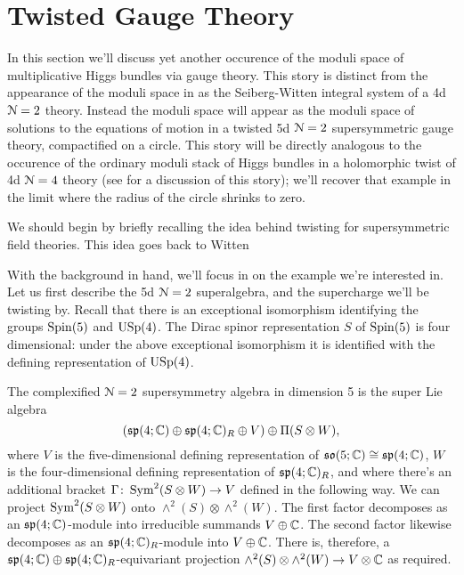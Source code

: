 \documentclass[10pt, oneside]{article}
\begin{document}
\section{Twisted Gauge Theory}
In this section we'll discuss yet another occurence of the moduli space of multiplicative Higgs bundles via gauge theory.  This story is distinct from the appearance of the moduli space in \cite{NekrasovPestun} as the Seiberg-Witten integral system of a 4d $\mathcal{N}=2$ theory.  Instead the moduli space will appear as the moduli space of solutions to the equations of motion in a twisted 5d $\mathcal{N}=2$ supersymmetric gauge theory, compactified on a circle.  This story will be directly analogous to the occurence of the ordinary moduli stack of Higgs bundles in a holomorphic twist of 4d $\mathcal{N}=4$ theory (see \cite{CostelloSH,ElliottYoo1} for a discussion of this story); we'll recover that example in the limit where the radius of the circle shrinks to zero.

We should begin by briefly recalling the idea behind twisting for supersymmetric field theories.  This idea goes back to Witten 

With the background in hand, we'll focus in on the example we're interested in.  Let us first describe the 5d $\mathcal{N}=2$ superalgebra, and the supercharge we'll be twisting by.  Recall that there is an exceptional isomorphism identifying the groups $\mathrm{Spin}(5)$ and $\mathrm{USp}(4)$.  The Dirac spinor representation $S$ of $\mathrm{Spin}(5)$ is four dimensional: under the above exceptional isomorphism it is identified with the defining representation of $\mathrm{USp}(4)$.

\begin{definition}
The complexified $\mathcal{N}=2$ supersymmetry algebra in dimension 5 is the super Lie algebra
\[(\mathfrak{sp}(4;\mathbb{C}) \oplus \mathfrak{sp}(4;\mathbb{C})_R \oplus V) \oplus \Pi(S \otimes W),\]
where $V$ is the five-dimensional defining representation of $\mathfrak{so}(5;\mathbb{C}) \cong \mathfrak{sp}(4;\mathbb{C})$, $W$ is the four-dimensional defining representation of $\mathfrak{sp}(4;\mathbb{C})_R$, and where there's an additional bracket $\Gamma \colon \operatorname{Sym}^2(S \otimes W) \to V$ defined in the following way.  We can project $\operatorname{Sym}^2(S \otimes W)$ onto $\wedge^2(S) \otimes \wedge^2(W)$.  The first factor decomposes as an $\mathfrak{sp}(4;\mathbb{C})$-module into irreducible summands $V \oplus \mathbb{C}$.  The second factor likewise decomposes as an $\mathfrak{sp}(4;\mathbb{C})_R$-module into $V \oplus \mathbb{C}$.  There is, therefore, a $\mathfrak{sp}(4;\mathbb{C}) \oplus \mathfrak{sp}(4;\mathbb{C})_R$-equivariant projection $\wedge^2(S) \otimes \wedge^2(W) \to V \otimes \mathbb{C}$ as required.
\end{definition}
\end{document}
